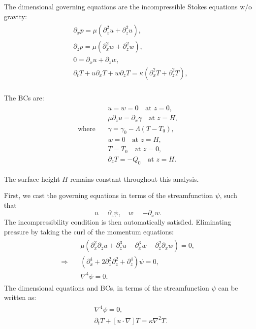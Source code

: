 \documentclass{article}
\begin{document}
The dimensional governing equations are the incompressible Stokes equations w/o gravity:
\begin{align}\label{eq:marangoni_convect_gov_eqns_dim_1}
 \begin{split}
  &\partial_{x}p = \mu (\partial^{2}_{x}u +\partial^{2}_{z}u),\\
  &\partial_{z}p = \mu (\partial^{2}_{x}w +\partial^{2}_{z}w),\\
  & 0 = \partial_{x}u + \partial_{z} w, \\
  & \partial_{t}T + u \partial_{x}T + w \partial_{z} T = \kappa (\partial^{2}_{x}T +\partial^{2}_{z}T),\\
 \end{split}
\end{align}

The BCs are:
\begin{align}
\label{eq:marangoni_convect_bcs_dim_1}
 \begin{split}
  & u = w = 0 \quad \textrm{at } z = 0,\\
  & \mu \partial_{z}u = \partial_{x}\gamma \quad \textrm{at } z = H,\\
  \textrm{where}\quad & \gamma = \gamma_{0}-\Lambda(T-T_{0}),\\
  & w = 0 \quad \textrm{at } z = H, \\
  & T=T_{0} \quad \textrm{at } z = 0, \\
  & \partial_{z}T = -Q_{0} \quad \textrm{at } z = H.
 \end{split}
\end{align}

The surface height $H$ remains constant throughout this analysis. 

First, we cast the governing equations in terms of the streamfunction $\psi$, such that 
\begin{equation}\label{eq:streamfunction_def}
 u = \partial_{z}\psi,\quad w = -\partial_{x}w.
\end{equation}
The incompressibility condition is then automatically satisfied. Eliminating pressure  by taking the curl of the momentum equations:
\begin{align}
 \begin{split}
  & \mu(\partial^{2}_{x} \partial_{z} u + \partial^{3}_{z} u - \partial^{3}_{x}  w - \partial^{2}_{z}\partial_{x} w)  = 0,\\
  \Rightarrow \quad & (\partial^{4}_{x} + 2\partial^{2}_{x}\partial^{2}_{z} + \partial^{4}_{z})\psi = 0,\\
  & \boxed{\nabla^{4}\psi = 0}.
 \end{split}
\end{align}
%
The dimensional equations and BCs, in terms of the streamfunction $\psi$ can be written as:
\begin{align}\label{eq:marangoni_convect_gov_eqns_dim}
 \begin{split}
  &\nabla^{4}\psi = 0, \\
  & \partial_{t}T + [u \cdot \nabla]T  = \kappa \nabla^{2}T.
 \end{split}
\end{align}
\end{document}
